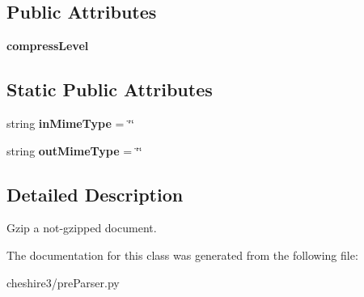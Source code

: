 \subsection*{Public Attributes}
\begin{DoxyCompactItemize}
\item 
\hypertarget{classcheshire3_1_1pre_parser_1_1_gzip_pre_parser_a374ba004e95a2bf72121980168057205}{{\bfseries compress\-Level}}\label{classcheshire3_1_1pre_parser_1_1_gzip_pre_parser_a374ba004e95a2bf72121980168057205}

\end{DoxyCompactItemize}
\subsection*{Static Public Attributes}
\begin{DoxyCompactItemize}
\item 
\hypertarget{classcheshire3_1_1pre_parser_1_1_gzip_pre_parser_a3aa4337f7780c6624fee916c6d8ac911}{string {\bfseries in\-Mime\-Type} = \char`\"{}\char`\"{}}\label{classcheshire3_1_1pre_parser_1_1_gzip_pre_parser_a3aa4337f7780c6624fee916c6d8ac911}

\item 
\hypertarget{classcheshire3_1_1pre_parser_1_1_gzip_pre_parser_a84dfc7046ac72078bc06136d9c4b1b71}{string {\bfseries out\-Mime\-Type} = \char`\"{}\char`\"{}}\label{classcheshire3_1_1pre_parser_1_1_gzip_pre_parser_a84dfc7046ac72078bc06136d9c4b1b71}

\end{DoxyCompactItemize}


\subsection{Detailed Description}
\begin{DoxyVerb}Gzip a not-gzipped document.\end{DoxyVerb}
 

The documentation for this class was generated from the following file\-:\begin{DoxyCompactItemize}
\item 
cheshire3/pre\-Parser.\-py\end{DoxyCompactItemize}

